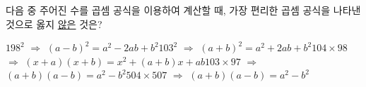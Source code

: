 다음 중 주어진 수를 곱셈 공식을 이용하여 계산할 때, 가장 편리한 곱셈 공식을 나타낸 것으로 옳지 \underline{않은} 것은?
\begin{choicesv}{$198^2$ $\Rightarrow$ $(a-b)^2=a^2-2ab+b^2$}{$103^2$ $\Rightarrow$ $(a+b)^2=a^2+2ab+b^2$}{$104\times 98$ $\Rightarrow$ $(x+a)(x+b)=x^2+(a+b)x+ab$}{$103\times 97$ $\Rightarrow$ $(a+b)(a-b)=a^2-b^2$}{$504\times 507$ $\Rightarrow$ $(a+b)(a-b)=a^2-b^2$}\end{choicesv}
